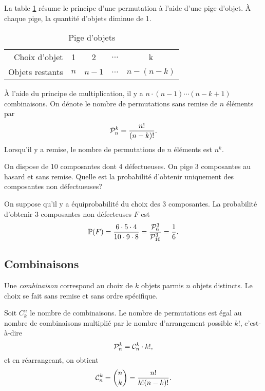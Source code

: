 \documentclass[11pt]{article}
\newcommand\comb[2]{%
	\ensuremath{%
		\mathcal{C}_{#2}^{#1}%
	}%
}%
\newcommand\perm[2]{%
	\ensuremath{%
		\mathcal{P}_{#2}^{#1}%
	}%
}%
\renewcommand\P{%
	\ensuremath{%
		\mathbb{P}%
	}%
}%
\begin{document}
La table \ref{tb:permutation} résume le principe d'une permutation à l'aide
d'une pige d'objet. À chaque pige, la quantité d'objets diminue de 1.

\begin{table}[H]
	\centering
	\caption{Pige d'objets}
	\begin{tabular}{r|cccc}
		\toprule
		Choix d'objet   &   1 &   2   & $\dots$ & k\\
		Objets restants & $n$ & $n-1$ & $\dots$ & $n-(n-k)$\\
		\bottomrule
	\end{tabular}
	\label{tb:permutation}
\end{table}

À l'aide du principe de multiplication, il y a $n\cdot(n-1)\cdots(n-k+1)$
combinaisons. On dénote le nombre de permutations sans remise de $n$ éléments
par
\begin{equation*}
	\perm{k}{n}=\frac{n!}{(n-k)!}.
\end{equation*}
Lorsqu'il y a remise, le nombre de permutations de $n$ éléments est $n^k$.

\begin{exemple}
	On dispose de 10 composantes dont 4 défectueuses. On pige 3 composantes au
	hasard et sans remise. Quelle est la probabilité d'obtenir uniquement des
	composantes non défectueuses?

	On suppose qu'il y a équiprobabilité du choix des 3 composantes. La
	probabilité d'obtenir 3 composantes non défecteuses $F$ est
	\begin{equation*}
		\P(F)
		=\frac{6\cdot 5\cdot 4}{10\cdot 9\cdot 8}
		=\frac{\perm{3}{6}}{\perm{3}{10}}
		=\frac{1}{6}.
	\end{equation*}
\end{exemple}

\subsection{Combinaisons}
\begin{definition}
	Une \textit{combinaison} correspond au choix de $k$ objets parmis $n$
	objets distincts. Le choix se fait sans remise et sans ordre spécifique.
\end{definition}

Soit $C_k^n$ le nombre de combinaisons. Le nombre de permutations est égal au
nombre de combinaisons multiplié par le nombre d'arrangement possible $k!$,
c'est-à-dire 
\begin{equation*}
	\perm{k}{n}=\comb{k}{n}\cdot k!,
\end{equation*}
et en réarrangeant, on obtient
\begin{equation*}
	\comb{k}{n}={{n}\choose{k}}=\frac{n!}{k!(n-k)!}.
\end{equation*}
\end{document}
